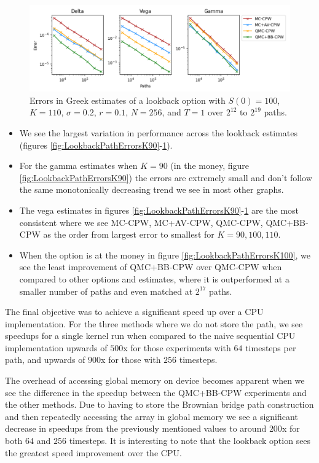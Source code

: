 \begin{figure}[H]
    \centering
    \includegraphics[width=1\textwidth]{figures/lookback path errors k=110.pdf}
    \caption{Errors in Greek estimates of a lookback option with $S(0)=100$, $K=110$, $\sigma = 0.2$, $r=0.1$, $N=256$, and $T=1$ over $2^{12}$ to $2^{19}$ paths.}
    \label{fig:LookbackPathErrorsK110}
\end{figure}

\begin{itemize}
    \item We see the largest variation in performance across the lookback estimates (figures \ref{fig:LookbackPathErrorsK90}-\ref{fig:LookbackPathErrorsK110}).
    \item For the gamma estimates when $K=90$ (in the money, figure \ref{fig:LookbackPathErrorsK90}) the errors are extremely small and don't follow the same monotonically decreasing trend we see in most other graphs.
    \item The vega estimates in figures \ref{fig:LookbackPathErrorsK90}-\ref{fig:LookbackPathErrorsK110} are the most consistent where we see MC-CPW, MC+AV-CPW, QMC-CPW, QMC+BB-CPW as the order from largest error to smallest for $K=90,100,110$.
    \item When the option is at the money in figure \ref{fig:LookbackPathErrorsK100}, we see the least improvement of QMC+BB-CPW over QMC-CPW when compared to other options and estimates, where it is outperformed at a smaller number of paths and even matched at $2^{17}$ paths.
\end{itemize}
 

The final objective was to achieve a significant speed up over a CPU implementation. For the three methods where we do not store the path, we see speedups for a single kernel run when compared to the naive sequential CPU implementation upwards of $500$x for those experiments with $64$ timesteps per path, and upwards of $900$x for those with $256$ timesteps.

The overhead of accessing global memory on device becomes apparent when we see the difference in the speedup between the QMC+BB-CPW experiments and the other methods. Due to having to store the Brownian bridge path construction and then repeatedly accessing the array in global memory we see a significant decrease in speedups from the previously mentioned values to around $200$x for both $64$ and $256$ timesteps. It is interesting to note that the lookback option sees the greatest speed improvement over the CPU.

